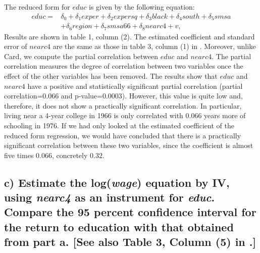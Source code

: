 \documentclass[a4paper, 12pt, twoside]{article}
\begin{document}
The reduced form for $educ$ is given by the following equation:
\begin{equation*}
\begin{split}
educ=&\delta_0+\delta{_1}exper+\delta{_2}expersq+\delta{_3}black+\delta{_4}south+\delta{_5}smsa\\
&+\delta{_6}region+\delta{_7}smsa66+\delta{_8}nearc4+v, 
\end{split}
\end{equation*}
Results are shown in table 1, column (2). The estimated coefficient and standard error of $nearc4$ are the same as those in table 3, column (1) in \cite{Card}. Moreover, unlike Card, we compute the partial correlation between $educ$ and  $nearc4$. The partial correlation measures the degree of correlation between two variables once the effect of the other variables has been removed. The results show that $educ$ and $nearc4$ have a positive and statistically significant partial correlation (partial correlation=0.066 and p-value=0.0003). However, this value is quite low and, therefore, it does not show a practically significant correlation. In particular, living near a 4-year college in 1966 is only correlated with 0.066 years more of schooling in 1976. If we had only looked at the estimated coefficient of the reduced form regression, we would have concluded that there is a practically significant correlation between these two variables, since the coefficient is almost five times 0.066, concretely 0.32.
\par\vspace{\baselineskip}


\subsection*{c) Estimate the log(\textit{wage}) equation by IV, using \textit{nearc4} as an instrument for \textit{educ}. Compare the 95 percent confidence interval for the return to education with that obtained from part a. [See also Table 3, Column (5) in \cite{Card}.]}
\end{document}
